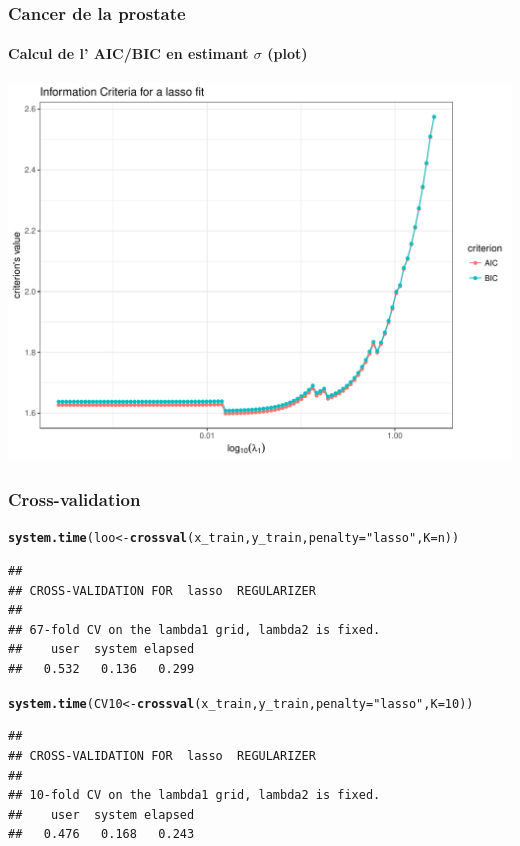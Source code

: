 \documentclass[10pt, c, xcolor=x11names]{beamer}\usepackage[]{graphicx}\usepackage[]{color}
\makeatletter
\newcommand{\hlnum}[1]{\textcolor[rgb]{0.686,0.059,0.569}{#1}}%
\newcommand{\hlstr}[1]{\textcolor[rgb]{0.192,0.494,0.8}{#1}}%
\newcommand{\hlstd}[1]{\textcolor[rgb]{0.345,0.345,0.345}{#1}}%
\newcommand{\hlkwb}[1]{\textcolor[rgb]{0.69,0.353,0.396}{#1}}%
\newcommand{\hlkwc}[1]{\textcolor[rgb]{0.333,0.667,0.333}{#1}}%
\newcommand{\hlkwd}[1]{\textcolor[rgb]{0.737,0.353,0.396}{\textbf{#1}}}%
\newenvironment{kframe}{%
 \def\at@end@of@kframe{}%
 \ifinner\ifhmode%
  \def\at@end@of@kframe{\end{minipage}}%
  \begin{minipage}{\columnwidth}%
 \fi\fi%
 \def\FrameCommand##1{\hskip\@totalleftmargin \hskip-\fboxsep
 \colorbox{shadecolor}{##1}\hskip-\fboxsep
     \hskip-\linewidth \hskip-\@totalleftmargin \hskip\columnwidth}%
 \MakeFramed {\advance\hsize-\width
   \@totalleftmargin\z@ \linewidth\hsize
   \@setminipage}}%
 {\par\unskip\endMakeFramed%
 \at@end@of@kframe}
\newenvironment{knitrout}{}{} %
\makeatother
\begin{document}
\begin{frame}[containsverbatim]
 \frametitle{Cancer de la prostate}
 \framesubtitle{Calcul de l' AIC/BIC en estimant $\sigma$ (plot)}

\begin{knitrout}\scriptsize
{}\color{fgcolor}
\includegraphics[width=.8\textwidth]{figures/crit_lassounnamed-chunk-33-1} 

\end{knitrout}
\end{frame}

\begin{frame}[containsverbatim]
  \frametitle{Cross-validation}

\begin{knitrout}\scriptsize
{}\color{fgcolor}\begin{kframe}
\begin{alltt}
\hlkwd{system.time}\hlstd{(loo} \hlkwb{<-} \hlkwd{crossval}\hlstd{(x_train, y_train,} \hlkwc{penalty} \hlstd{=} \hlstr{"lasso"}\hlstd{,} \hlkwc{K} \hlstd{= n))}
\end{alltt}
\begin{verbatim}
## 
## CROSS-VALIDATION FOR  lasso  REGULARIZER 
## 
## 67-fold CV on the lambda1 grid, lambda2 is fixed.
##    user  system elapsed 
##   0.532   0.136   0.299
\end{verbatim}
\end{kframe}
\end{knitrout}

\begin{knitrout}\scriptsize
{}\color{fgcolor}\begin{kframe}
\begin{alltt}
\hlkwd{system.time}\hlstd{(CV10} \hlkwb{<-} \hlkwd{crossval}\hlstd{(x_train, y_train,} \hlkwc{penalty} \hlstd{=} \hlstr{"lasso"}\hlstd{,} \hlkwc{K} \hlstd{=} \hlnum{10}\hlstd{))}
\end{alltt}
\begin{verbatim}
## 
## CROSS-VALIDATION FOR  lasso  REGULARIZER 
## 
## 10-fold CV on the lambda1 grid, lambda2 is fixed.
##    user  system elapsed 
##   0.476   0.168   0.243
\end{verbatim}
\end{kframe}
\end{knitrout}

\end{frame}
\end{document}
